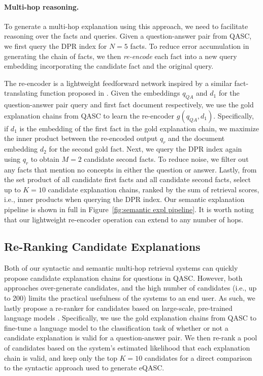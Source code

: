 \documentclass[letterpaper]{article} %
\begin{document}
\paragraph{Multi-hop reasoning.}
To generate a multi-hop explanation using this approach, we need to facilitate reasoning over the facts and queries. Given a question-answer pair from QASC, we first query the DPR index for {$N=5$} facts. To reduce error accumulation in generating the chain of facts, we then \textit{re-encode} each fact into a new query embedding incorporating the candidate fact and the original query.

The re-encoder is a lightweight feedforward network inspired by a similar fact-translating function proposed in \citet{lin-etal-2021-differentiable}. Given the embeddings $q_{QA}$ and $d_1$ for the question-answer pair query and first fact document respectively, we use the gold explanation chains from QASC to learn the re-encoder $g(q_{QA}, d_1)$. Specifically, if $d_1$ is the embedding of the first fact in the gold explanation chain, we maximize the inner product between the re-encoded output $q_{r}$ and the document embedding $d_2$ for the second gold fact. Next, we query the DPR index again using $q_r$ to obtain {$M=2$} candidate second facts. To reduce noise, we filter out any facts that mention no concepts in either the question or answer.
Lastly, from the set product of all candidate first facts and all candidate second facts, select up to $K=10$ candidate explanation chains, ranked by the sum of retrieval scores, i.e., inner products when querying the DPR index. Our semantic explanation pipeline is shown in full in Figure~\ref{fig:semantic expl pipeline}. It is worth noting that our lightweight re-encoder operation can extend to any number of hops.

\subsection{Re-Ranking Candidate Explanations}
Both of our syntactic and semantic multi-hop retrieval systems can quickly propose candidate explanation chains for questions in QASC. However, both approaches over-generate candidates, and the high number of candidates (i.e., up to 200) limits the practical usefulness of the systems to an end user. As such, we lastly propose a re-ranker for candidates based on large-scale, pre-trained language models \cite{devlin-etal-2019-bert,liu2019roberta}. Specifically, we use the gold explanation chains from QASC to fine-tune a language model to the classification task of whether or not a candidate explanation is valid for a question-answer pair. We then re-rank a pool of candidates based on the system's estimated likelihood that each explanation chain is valid, and keep only the top $K=10$ candidates for a direct comparison to the syntactic approach used to generate eQASC.
\end{document}
